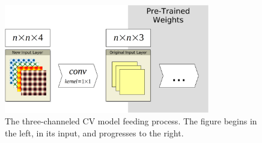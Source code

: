 \begin{figure}[h!]
	\centering
	\includegraphics[width=0.8\textwidth]{img/input_layer.png}
	\caption[The three-channeled \acrlong{CV} model feeding process.]{The three-channeled \acrlong{CV} model feeding process. The figure begins in the left, in its input, and progresses to the right. }
	\label{fig:input_layer}
\end{figure}
